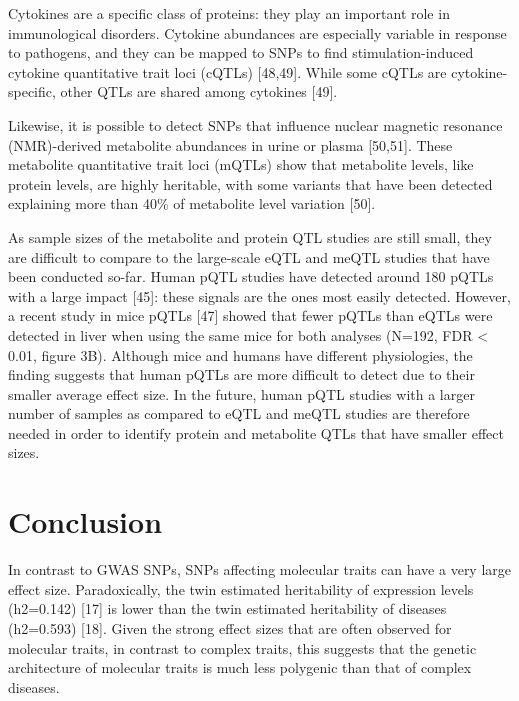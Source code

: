 Cytokines are a specific class of proteins: they play an important role in immunological disorders. Cytokine abundances are especially variable in response to pathogens, and they can be mapped to SNPs to find stimulation-induced cytokine quantitative trait loci (cQTLs) [48,49]. While some cQTLs are cytokine-specific, other QTLs are shared among cytokines [49].

Likewise, it is possible to detect SNPs that influence nuclear magnetic resonance (NMR)-derived metabolite abundances in urine or plasma [50,51]. These metabolite quantitative trait loci (mQTLs) show that metabolite levels, like protein levels, are highly heritable, with some variants that have been detected explaining more than 40\% of metabolite level variation [50]. 

As sample sizes of the metabolite and protein QTL studies are still small, they are difficult to compare to the large-scale eQTL and meQTL studies that have been conducted so-far. Human pQTL studies have detected around 180 pQTLs with a large impact [45]: these signals are the ones most easily detected. However, a recent study in mice pQTLs [47] showed that fewer pQTLs than eQTLs were detected in liver when using the same mice for both analyses (N=192, FDR < 0.01, figure 3B). Although mice and humans have different physiologies, the finding suggests that human pQTLs are more difficult to detect due to their smaller average effect size. In the future, human pQTL studies with a larger number of samples as compared to eQTL and meQTL studies are therefore needed in order to identify protein and metabolite QTLs that have smaller effect sizes.


\section{Conclusion}
In contrast to GWAS SNPs, SNPs affecting molecular traits can have a very large effect size. Paradoxically, the twin estimated heritability of expression levels (h2=0.142) [17] is lower than the twin estimated heritability of diseases (h2=0.593) [18]. Given the strong effect sizes that are often observed for molecular traits, in contrast to complex traits, this suggests that the genetic architecture of molecular traits is much less polygenic than that of complex diseases. 

